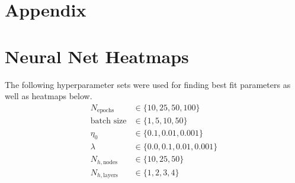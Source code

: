 \documentclass[a4paper]{article}
\newcommand{\Nhn}{N_{h,\text{nodes}}}
\newcommand{\Nhl}{N_{h,\text{layers}}}
\begin{document}
\appendix
\section*{Appendix} \label{chap:appendix}

\section{Neural Net Heatmaps} \label{app:nn_heatmaps}
The following hyperparameter sets were used for finding best fit parameters as well as heatmaps below.
\begin{align*}
	N_{\text{epochs}} &\in \{10, 25, 50, 100\}\\
	\text{batch size} &\in \{1, 5, 10, 50\}\\
	\eta_0 &\in \{0.1, 0.01, 0.001\}\\
	\lambda &\in \{0.0, 0.1, 0.01, 0.001\}\\
	\Nhn &\in \{10, 25, 50\}\\
	\Nhl &\in \{1, 2, 3, 4\}
\end{align*}
\end{document}
